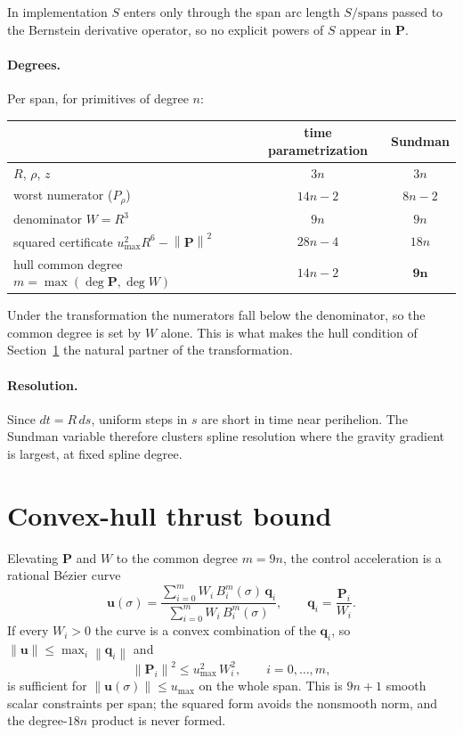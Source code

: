 \documentclass[11pt]{article}
\newcommand{\umax}{u_{\max}}
\newcommand{\norm}[1]{\left\lVert #1\right\rVert}
\begin{document}
In implementation $S$ enters only through the span arc length $S/\text{spans}$
passed to the Bernstein derivative operator, so no explicit powers of $S$ appear
in $\mathbf P$.

\paragraph{Degrees.} Per span, for primitives of degree $n$:

\begin{center}
\begin{tabular}{lcc}
\toprule
 & time parametrization & Sundman \\
\midrule
$R$, $\rho$, $z$                       & $3n$      & $3n$ \\
worst numerator ($P_\rho$)             & $14n-2$   & $8n-2$ \\
denominator $W=R^3$                    & $9n$      & $9n$ \\
squared certificate $\umax^2R^6-\norm{\mathbf P}^2$ & $28n-4$ & $18n$ \\
hull common degree $m=\max(\deg\mathbf P,\deg W)$   & $14n-2$ & $\mathbf{9n}$ \\
\bottomrule
\end{tabular}
\end{center}

Under the transformation the numerators fall below the denominator, so the
common degree is set by $W$ alone. This is what makes the hull condition of
Section~\ref{sec:hull} the natural partner of the transformation.

\paragraph{Resolution.} Since $dt=R\,ds$, uniform steps in $s$ are short in time
near perihelion. The Sundman variable therefore clusters spline resolution where
the gravity gradient is largest, at fixed spline degree.

\section{Convex-hull thrust bound}
\label{sec:hull}

Elevating $\mathbf P$ and $W$ to the common degree $m=9n$, the control
acceleration is a rational B\'ezier curve
\begin{equation}
  \mathbf u(\sigma)
  = \frac{\sum_{i=0}^{m} W_i\,B_i^m(\sigma)\,\mathbf q_i}
         {\sum_{i=0}^{m} W_i\,B_i^m(\sigma)},
  \qquad \mathbf q_i = \frac{\mathbf P_i}{W_i}.
\end{equation}
If every $W_i>0$ the curve is a convex combination of the $\mathbf q_i$, so
$\norm{\mathbf u}\le\max_i\norm{\mathbf q_i}$ and
\begin{equation}
  \norm{\mathbf P_i}^2 \le \umax^2\,W_i^2,
  \qquad i=0,\dots,m,
  \label{eq:hull}
\end{equation}
is sufficient for $\norm{\mathbf u(\sigma)}\le\umax$ on the whole span. This is
$9n+1$ smooth scalar constraints per span; the squared form avoids the
nonsmooth norm, and the degree-$18n$ product is never formed.
\end{document}
